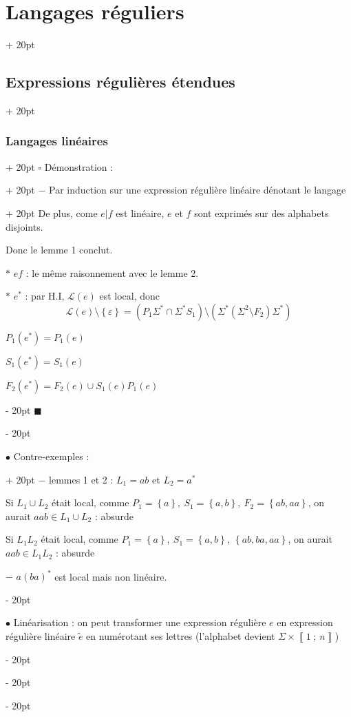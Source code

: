 \documentclass[a4paper, 12pt, twoside]{article}
\newcommand{\nset}[2]{\left\llbracket #1\ ;\ #2 \right\rrbracket}
\newcommand{\lr}[1]{\left( #1 \right)}
\newcommand{\set}[1]{\left\{ #1 \right\}}
\newcommand{\ind}[1][20pt]{\advance\leftskip + #1}
\newcommand{\deind}[1][20pt]{\advance\leftskip - #1}
\newenvironment{indt}[2][20pt]{#2 \par \ind[#1]}{\par \deind} %
\newenvironment{proof}[1][{Démonstration :}]{\begin{indt}{$\square$ #1}}{$\blacksquare$ \end{indt}}
\begin{document}
\begin{indt}{\section{Langages réguliers}}
\begin{indt}{\subsection{Expressions régulières étendues}}
\begin{indt}{\subsubsection{Langages linéaires}}
\begin{proof}
\begin{indt}{$-$ Par induction sur une expression régulière linéaire dénotant le langage}
                        De plus, come $e | f$ est linéaire, $e$ et $f$ sont exprimés sur des alphabets disjoints.

                        Donc le lemme 1 conclut.

                        $*$ $ef$ : le même raisonnement avec le lemme 2.

                        $*$ $e^*$ : par H.I, $\mathcal L(e)$ est local, donc
                        \[
                            \mathcal L(e) \setminus \set \varepsilon =
                            \lr{P_1 \Sigma^* \cap \Sigma^* S_1} \setminus \lr{\Sigma^* \lr{\Sigma^2 \setminus F_2} \Sigma^*}
                        \]

                        $P_1(e^*) = P_1(e)$

                        $S_1(e^*) = S_1(e)$

                        $F_2(e^*) = F_2(e) \cup S_1(e) P_1(e)$
                    \end{indt}
                \end{proof}

                \vspace{12pt}
                
                \begin{indt}{$\bullet$ Contre-exemples :}
                    $-$ lemmes 1 et 2 : $L_1 = ab$ et $L_2 = a^*$

                    Si $L_1 \cup L_2$ était local, comme $P_1 = \set a,\ S_1 = \set{a, b},\ F_2 = \set{ab, aa}$, on aurait $aab \in L_1 \cup L_2$ : absurde

                    Si $L_1 L_2$ était local, comme $P_1 = \set a,\ S_1 = \set{a, b},\ \set{ab, ba, aa}$, on aurait $aab \in L_1 L_2$ : absurde

                    \vspace{6pt}
                    
                    $-$ $a(ba)^*$ est local mais non linéaire.
                \end{indt}

                \vspace{12pt}
                
                $\bullet$ Linéarisation : on peut transformer une expression régulière $e$ en expression régulière linéaire $\tilde e$ en numérotant ses lettres (l'alphabet devient $\Sigma \times \nset 1 n$)

                \vspace{12pt}
                

\end{indt}
\end{indt}
\end{indt}
\end{document}
